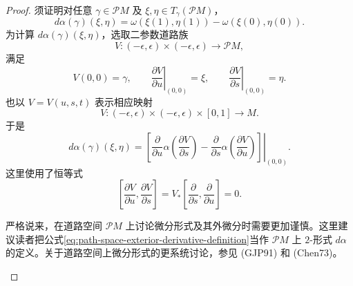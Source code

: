 \begin{proof}
须证明对任意 $\gamma\in\mathcal PM$ 及
$\xi,\eta\in T_\gamma(\mathcal PM)$，
\begin{equation}
 d\alpha(\gamma)(\xi,\eta)
 =\omega(\xi(1),\eta(1))-\omega(\xi(0),\eta(0)).
 \label{eq:action-one-form-boundary-values}
\end{equation}
为计算 $d\alpha(\gamma)(\xi,\eta)$，选取二参数道路族
\[
 V:(-\epsilon,\epsilon)\times(-\epsilon,\epsilon)\longrightarrow\mathcal PM,
\]
满足
\[
 V(0,0)=\gamma,\qquad
 \left.\frac{\partial V}{\partial u}\right|_{(0,0)}=\xi,\qquad
 \left.\frac{\partial V}{\partial s}\right|_{(0,0)}=\eta.
\]
也以 $V=V(u,s,t)$ 表示相应映射
\[
 V:(-\epsilon,\epsilon)\times(-\epsilon,\epsilon)\times[0,1]
 \longrightarrow M.
\]
于是
\begin{equation}
 d\alpha(\gamma)(\xi,\eta)
 =\left.\left[
 \frac\partial{\partial u}\alpha\left(\frac{\partial V}{\partial s}\right)
 -\frac\partial{\partial s}\alpha\left(\frac{\partial V}{\partial u}\right)
 \right]\right|_{(0,0)}.
 \label{eq:path-space-exterior-derivative-definition}
\end{equation}
这里使用了恒等式
\[
 \left[\frac{\partial V}{\partial u},\frac{\partial V}{\partial s}\right]
 =V_*\left[\frac\partial{\partial s},\frac\partial{\partial u}\right]=0.
\]

\begin{remark}\label{rem:path-space-differential-forms}
严格说来，在道路空间 $\mathcal PM$ 上讨论微分形式及其外微分时需要更加谨慎。这里建议读者把公式\eqref{eq:path-space-exterior-derivative-definition}当作
$\mathcal PM$ 上 $2$-形式 $d\alpha$ 的定义。关于道路空间上微分形式的更系统讨论，参见 (GJP91) 和 (Chen73)。
\end{remark}


\end{proof}
